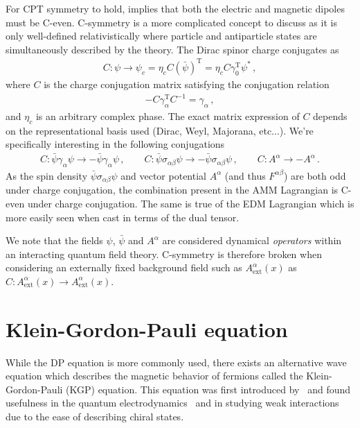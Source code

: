 For CPT symmetry to hold,  implies that both the electric and magnetic dipoles must be C-even. C-symmetry is a more complicated concept to discuss as it is only well-defined relativistically where particle and antiparticle states are simultaneously described by the theory. The Dirac spinor charge conjugates as
\begin{align}
    \label{c:1}
    C:\psi\rightarrow\psi_{c}=\eta_{c}C(\bar\psi)^\mathrm{T}= \eta_{c}C\gamma_{0}^\mathrm{T}\psi^{*}\,,
\end{align}
where $C$ is the charge conjugation matrix satisfying the conjugation relation
\begin{align}
    \label{c:2}
    -C\gamma_{\alpha}^\mathrm{T}C^{-1}=\gamma_{\alpha}\,,
\end{align}
and $\eta_{c}$ is an arbitrary complex phase. The exact matrix expression of $C$ depends on the representational basis used (Dirac, Weyl, Majorana, etc...). We're specifically interesting in the following conjugations
\begin{align}
    \label{c:3}
    C:\bar\psi\gamma_{\alpha}\psi\rightarrow-\bar\psi\gamma_{\alpha}\psi\,,\qquad
    C:\bar\psi\sigma_{\alpha\beta}\psi\rightarrow-\bar\psi\sigma_{\alpha\beta}\psi\,,\qquad
    C:A^{\alpha}\rightarrow-A^{\alpha}\,.
\end{align}
As the spin density $\bar\psi\sigma_{\alpha\beta}\psi$ and vector potential $A^{\alpha}$ (and thus $F^{\alpha\beta}$) are both odd under charge conjugation, the combination present in the AMM Lagrangian  is C-even under charge conjugation. The same is true of the EDM Lagrangian  which is more easily seen when cast in terms of the dual tensor.

We note that the fields $\psi$, $\bar\psi$ and $A^{\alpha}$ are considered dynamical \emph{operators} within an interacting quantum field theory. C-symmetry is therefore broken when considering an externally fixed background field such as $A_\mathrm{ext}^{\alpha}(x)$ as $C:A_\mathrm{ext}^{\alpha}(x)\rightarrow A_\mathrm{ext}^{\alpha}(x)$.

\section{Klein-Gordon-Pauli equation}
\label{sec:kgp}
\noindent While the DP equation is more commonly used, there exists an alternative wave equation which describes the magnetic behavior of fermions called the Klein-Gordon-Pauli (KGP) equation. This equation was first introduced by~\cite{Fock:1937dy} and found usefulness in the quantum electrodynamics~\citep{Feynman:1951gn} and in studying weak interactions~\citep{Feynman:1958ty} due to the ease of describing chiral states.

